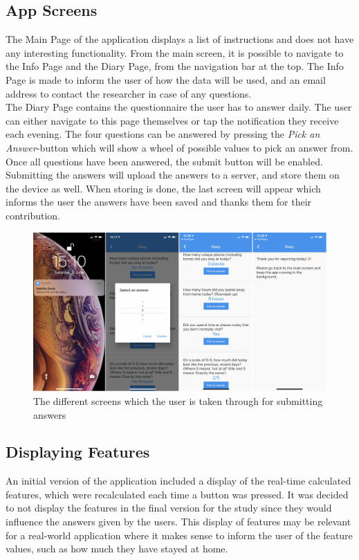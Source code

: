\subsection{App Screens}
The Main Page of the application displays a list of instructions and does not have any interesting functionality. From the main screen, it is possible to navigate to the Info Page and the Diary Page, from the navigation bar at the top. The Info Page is made to inform the user of how the data will be used, and an email address to contact the researcher in case of any questions. \\

The Diary Page contains the questionnaire the user has to answer daily. The user can either navigate to this page themselves or tap the notification they receive each evening. The four questions can be answered by pressing the \textit{Pick an Answer}-button which will show a wheel of possible values to pick an answer from. Once all questions have been answered, the submit button will be enabled. Submitting the answers will upload the answers to a server, and store them on the device as well. When storing is done, the last screen will appear which informs the user the answers have been saved and thanks them for their contribution.

\begin{figure}[h]
    \centering
    \includegraphics[width=\textwidth]{images/app_imgs/screens-answers.pdf}
    \caption{The different screens which the user is taken through for submitting answers}
    \label{fig:screens-answers}
\end{figure}

\subsection{Displaying Features}
An initial version of the application included a display of the real-time calculated features, which were recalculated each time a button was pressed. It was decided to not display the features in the final version for the study since they would influence the answers given by the users. This display of features may be relevant for a real-world application where it makes sense to inform the user of the feature values, such as how much they have stayed at home.

